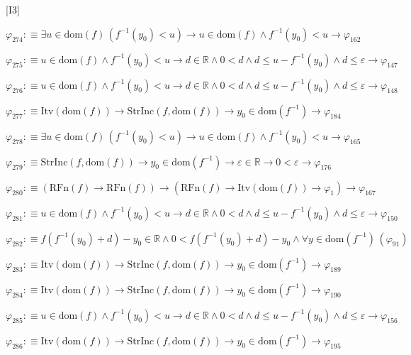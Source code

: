 \begin{fullproof}{[I3]}
\begin{abbrevlist}
\item $\varphi_{274} :\equiv \exists u \in \mathrm{dom}(f)\,(f^{-1}(y_{0}) < u) \to u \in \mathrm{dom}(f) \land f^{-1}(y_{0}) < u \to \varphi_{162}$
\item $\varphi_{275} :\equiv u \in \mathrm{dom}(f) \land f^{-1}(y_{0}) < u \to d \in \mathbb{R} \land 0 < d \land d \leq u - f^{-1}(y_{0}) \land d \leq \varepsilon \to \varphi_{147}$
\item $\varphi_{276} :\equiv u \in \mathrm{dom}(f) \land f^{-1}(y_{0}) < u \to d \in \mathbb{R} \land 0 < d \land d \leq u - f^{-1}(y_{0}) \land d \leq \varepsilon \to \varphi_{148}$
\item $\varphi_{277} :\equiv \mathrm{Itv}(\mathrm{dom}(f)) \to \mathrm{StrInc}(f,\mathrm{dom}(f)) \to y_{0} \in \mathrm{dom}(f^{-1}) \to \varphi_{184}$
\item $\varphi_{278} :\equiv \exists u \in \mathrm{dom}(f)\,(f^{-1}(y_{0}) < u) \to u \in \mathrm{dom}(f) \land f^{-1}(y_{0}) < u \to \varphi_{165}$
\item $\varphi_{279} :\equiv \mathrm{StrInc}(f,\mathrm{dom}(f)) \to y_{0} \in \mathrm{dom}(f^{-1}) \to \varepsilon \in \mathbb{R} \to 0 < \varepsilon \to \varphi_{176}$
\item $\varphi_{280} :\equiv (\mathrm{RFn}(f) \to \mathrm{RFn}(f)) \to (\mathrm{RFn}(f) \to \mathrm{Itv}(\mathrm{dom}(f)) \to \varphi_{1}) \to \varphi_{167}$
\item $\varphi_{281} :\equiv u \in \mathrm{dom}(f) \land f^{-1}(y_{0}) < u \to d \in \mathbb{R} \land 0 < d \land d \leq u - f^{-1}(y_{0}) \land d \leq \varepsilon \to \varphi_{150}$
\item $\varphi_{282} :\equiv f(f^{-1}(y_{0}) + d) - y_{0} \in \mathbb{R} \land 0 < f(f^{-1}(y_{0}) + d) - y_{0} \land \forall y \in \mathrm{dom}(f^{-1})\,(\varphi_{91})$
\item $\varphi_{283} :\equiv \mathrm{Itv}(\mathrm{dom}(f)) \to \mathrm{StrInc}(f,\mathrm{dom}(f)) \to y_{0} \in \mathrm{dom}(f^{-1}) \to \varphi_{189}$
\item $\varphi_{284} :\equiv \mathrm{Itv}(\mathrm{dom}(f)) \to \mathrm{StrInc}(f,\mathrm{dom}(f)) \to y_{0} \in \mathrm{dom}(f^{-1}) \to \varphi_{190}$
\item $\varphi_{285} :\equiv u \in \mathrm{dom}(f) \land f^{-1}(y_{0}) < u \to d \in \mathbb{R} \land 0 < d \land d \leq u - f^{-1}(y_{0}) \land d \leq \varepsilon \to \varphi_{156}$
\item $\varphi_{286} :\equiv \mathrm{Itv}(\mathrm{dom}(f)) \to \mathrm{StrInc}(f,\mathrm{dom}(f)) \to y_{0} \in \mathrm{dom}(f^{-1}) \to \varphi_{195}$

\end{abbrevlist}
\end{fullproof}
